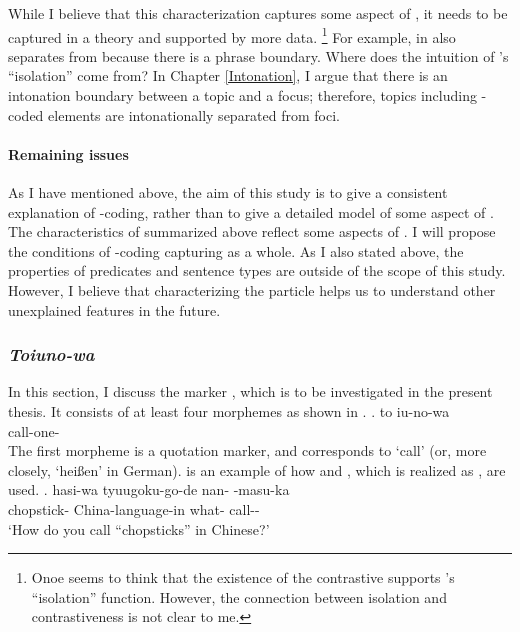 While I believe that this characterization captures
some aspect of ,
it needs to be captured in a theory and supported by more data.%
 \footnote{
 Onoe seems to think that the existence of the contrastive 
 supports 's ``isolation'' function.
 However, the connection between isolation and contrastiveness is not clear to me.
 }
For example,
 in \Last[a] also separates  from  because
there is a phrase boundary.
Where does the intuition of 's ``isolation'' come from?
In Chapter \ref{Intonation},
I argue that there is an intonation boundary between a topic and a focus;
therefore, topics including -coded elements are intonationally separated from foci.


\paragraph{Remaining issues}

As I have mentioned above,
the aim of this study is to give a consistent explanation of -coding,
rather than to give a detailed model of some aspect of .
The characteristics of  summarized above reflect some aspects of .
I will propose the conditions of -coding capturing  as a whole.
As I also stated above,
the properties of predicates and sentence types are outside of the scope of this study.
However, I believe that characterizing the particle  helps us to understand other unexplained features in the future.

\subsubsection{\textit{Toiuno-wa}}\label{Back:GeneralChar:Toiunowa}

In this section,
I discuss the marker ,
which is to be investigated in the present thesis.
It consists of at least four morphemes as shown in \Next.
%
\exg. to iu-no-wa \\
	 call-one- \\

The first morpheme  is a quotation marker,
and  corresponds to `call' (or, more closely, `hei{\ss}en' in German).
\Next is an example of how  and , which is realized as , are used.
%
\exg. hasi-wa tyuugoku-go-de nan- -masu-ka \\
		chopstick- China-language-in what- call-- \\
		`How do you call ``chopsticks'' in Chinese?'
		\hfill{\cite[][p.\ 81]{masuokatakubo92}}

